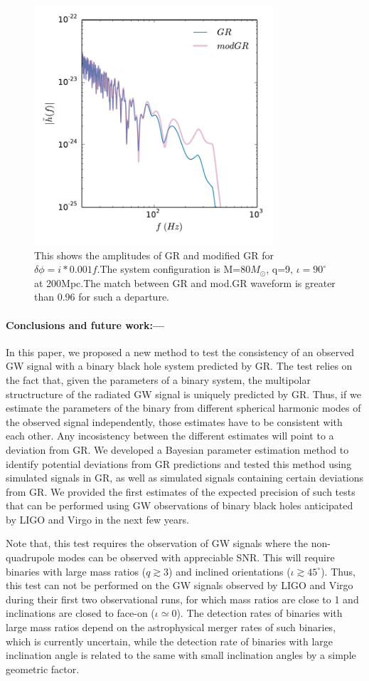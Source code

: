 \documentclass[prl,preprintnumbers,twocolumn,eqsecnum,floatfix,a4paper,nofootinbib,superscriptaddress]{revtex4}
\begin{document}
\begin{figure}[h]
	\includegraphics*[width=3.5in]{figs/fig2.pdf}
	\caption{This shows the amplitudes of GR and modified GR for $\delta \phi =i*0.001f$.The system configuration is M=80$M_{\odot}$, q=9, $\iota=90^{\circ}$ at 200Mpc.The match between GR and mod.GR waveform is greater than 0.96 for such a departure.}
\label{fig:mod_gr_waveform}
\end{figure}

\paragraph{Conclusions and future work:---} In this paper, we proposed a new method to test the consistency of an observed GW signal with a binary black hole system predicted by GR. The test relies on the fact that, given the parameters of a binary system, the multipolar structructure of the radiated GW signal is uniquely predicted by GR. Thus, if we estimate the parameters of the binary from different spherical harmonic modes of the observed signal independently, those estimates have to be consistent with each other. Any incosistency between the different estimates will point to a deviation from GR. We developed a Bayesian parameter estimation method to identify potential deviations from GR predictions and tested this method using simulated signals in GR, as well as simulated signals containing certain deviations from GR.  We provided the first estimates of the expected precision of such tests that can be performed using GW observations of binary black holes anticipated by LIGO and Virgo in the next few years. 

Note that, this test requires the observation of GW signals where the non-quadrupole modes can be observed with appreciable SNR. This will require binaries with large mass ratios ($q \gtrsim 3$) and inclined orientations ($\iota \gtrsim 45^{\circ}$). Thus, this test can not be performed on the GW signals observed by LIGO and Virgo during their first two observational runs, for which mass ratios are close to 1 and inclinations are closed to face-on ($\iota \simeq 0$). The detection rates of binaries with large mass ratios depend on the astrophysical merger rates of such binaries, which is currently uncertain, while the detection rate of binaries with large inclination angle is related to the same with small inclination angles by a simple geometric factor. 
\end{document}
